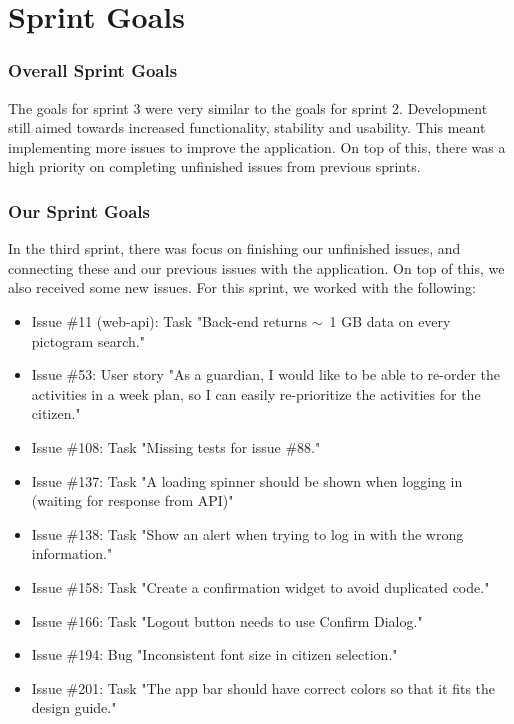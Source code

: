 \section{Sprint Goals}
\label{sect:sprintGoals3}
\subsubsection{Overall Sprint Goals}
The goals for sprint 3 were very similar to the goals for sprint 2. Development still aimed towards increased functionality, stability and usability. This meant implementing more issues to improve the application. On top of this, there was a high priority on completing unfinished issues from previous sprints.

\subsubsection{Our Sprint Goals}
In the third sprint, there was focus on finishing our unfinished issues, and connecting these and our previous issues with the application. 
On top of this, we also received some new issues. 
For this sprint, we worked with the following:
\begin{itemize}
    \item Issue \#11 (web-api): Task "Back-end returns $\sim$~1 GB data on every pictogram search."
    \item Issue \#53: User story "As a guardian, I would like to be able to re-order the activities in a week plan, so I can easily re-prioritize the activities for the citizen."
    \item Issue \#108: Task "Missing tests for issue \#88."
    \item Issue \#137: Task "A loading spinner should be shown when logging in (waiting for response from API)"
    \item Issue \#138: Task "Show an alert when trying to log in with the wrong information."
    \item Issue \#158: Task "Create a confirmation widget to avoid duplicated code."
    \item Issue \#166: Task "Logout button needs to use Confirm Dialog."
    \item Issue \#194: Bug "Inconsistent font size in citizen selection."
    \item Issue \#201: Task "The app bar should have correct colors so that it fits the design guide."
\end{itemize}




